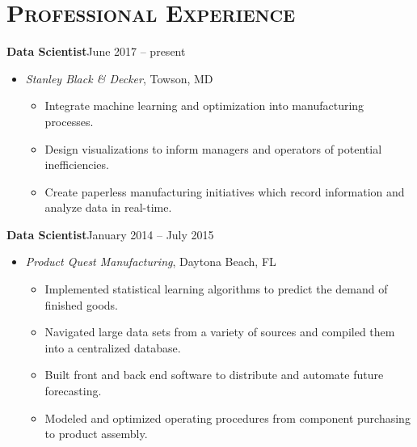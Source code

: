 \documentclass[10pt]{article}
\begin{document}
\section*{\textsc{Professional Experience}}
\textbf{Data Scientist}\hfill June 2017 -- present
\begin{itemize}[noitemsep]
	\item[] \textit{Stanley Black \& Decker}, Towson, MD
	\begin{itemize}[noitemsep]
		\item Integrate machine learning and optimization into manufacturing processes.
		\item Design visualizations to inform managers and operators of potential inefficiencies.
		\item Create paperless manufacturing initiatives which record information and analyze data in real-time.
	\end{itemize}
\end{itemize}
\textbf{Data Scientist}\hfill January 2014 -- July 2015
\begin{itemize}[noitemsep]
    \item[] \textit{Product Quest Manufacturing}, Daytona Beach, FL
    \begin{itemize}[noitemsep]
        \item Implemented statistical learning algorithms to predict the demand of finished goods.
        \item Navigated large data sets from a variety of sources and compiled them into a centralized database.
        \item Built front and back end software to distribute and automate future forecasting.
        \item Modeled and optimized operating procedures from component purchasing to product assembly.
    \end{itemize}
\end{itemize}
\end{document}
